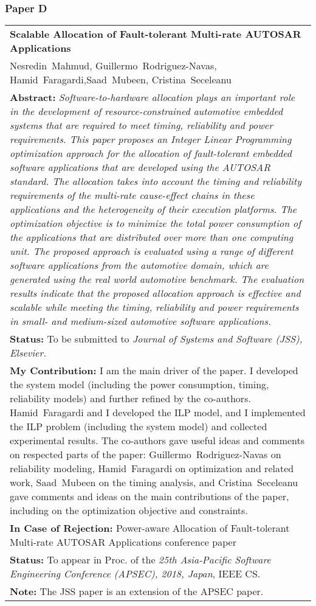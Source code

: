 \subsubsection{Paper D}
\begin{tabular}{p{\textwidth}}
\textbf{Scalable Allocation of Fault-tolerant Multi-rate AUTOSAR Applications}\\%
Nesredin~Mahmud, Guillermo~Rodriguez-Navas, Hamid~Faragardi,Saad~Mubeen, Cristina~Seceleanu\\[6pt]%
\textbf{Abstract:} \textit{Software-to-hardware allocation plays an important
role in the development of resource-constrained automotive
embedded systems that are required to meet timing, reliability
and power requirements. This paper proposes an Integer Linear
Programming optimization approach for the allocation of fault-tolerant
embedded software applications that are developed using
the AUTOSAR standard. The allocation takes into account the
timing and reliability requirements of the multi-rate cause-effect
chains in these applications and the heterogeneity of their
execution platforms. The optimization objective is to minimize the
total power consumption of the applications that are distributed
over more than one computing unit. The proposed approach is
evaluated using a range of different software applications from
the automotive domain, which are generated using the real world
automotive benchmark. The evaluation results indicate
that the proposed allocation approach is effective and scalable
while meeting the timing, reliability and power requirements in
small- and medium-sized automotive software applications.
}\\[6pt]%
\textbf{Status: }To be submitted to \textit{Journal of Systems and Software (JSS), Elsevier.}\\%
\textbf{My Contribution: }I am the main driver of the paper. I developed the system model (including the power consumption, timing, reliability models) and further refined by the co-authors. Hamid~Faragardi and I developed the ILP model, and I implemented the ILP problem (including the system model) and collected experimental results. The co-authors gave useful ideas and comments on respected parts of the paper: Guillermo~Rodriguez-Navas on reliability modeling, Hamid~Faragardi on optimization and related work, Saad~Mubeen on the timing analysis, and Cristina~Seceleanu gave comments and ideas on the main contributions of the paper, including on the optimization objective and constraints.\\%
\textbf{In Case of Rejection: }Power-aware Allocation of Fault-tolerant Multi-rate AUTOSAR Applications conference paper\\
\textbf{Status:} To appear in Proc. of the \textit{25th Asia-Pacific Software Engineering Conference (APSEC), 2018, Japan}, IEEE CS.\\
\textbf{Note: }The JSS paper is an extension of the APSEC paper.\\
\end{tabular}

